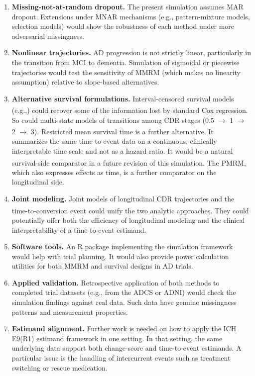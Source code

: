\documentclass[
  11pt,
]{article}
\begin{document}
\begin{enumerate}
\def\labelenumi{\arabic{enumi}.}
\item
  \textbf{Missing-not-at-random dropout.} The present
  simulation assumes MAR dropout. Extensions under MNAR
  mechanisms (e.g., pattern-mixture models, selection
  models) would show the robustness of each method under
  more adversarial missingness.
\item
  \textbf{Nonlinear trajectories.} AD progression is not
  strictly linear, particularly in the transition from
  MCI to dementia. Simulation of sigmoidal or piecewise
  trajectories would test the sensitivity of MMRM (which
  makes no linearity assumption) relative to slope-based
  alternatives.
\item
  \textbf{Alternative survival formulations.} Interval-censored
  survival models (e.g.,\textsuperscript{}) could recover
  some of the information lost by standard Cox
  regression. So could multi-state models of transitions
  among CDR stages (0.5 \(\to\) 1 \(\to\) 2 \(\to\) 3).
  Restricted mean survival time\textsuperscript{}
  is a further alternative. It summarizes the same
  time-to-event data on a continuous, clinically
  interpretable time scale and not as a hazard ratio. It
  would be a natural survival-side comparator in a future
  revision of this simulation. The PMRM\textsuperscript{}, which also expresses effects as time,
  is a further comparator on the longitudinal side.
\item
  \textbf{Joint modeling.} Joint models of longitudinal CDR
  trajectories and the time-to-conversion event\textsuperscript{} could unify the two analytic
  approaches. They could potentially offer both the
  efficiency of longitudinal modeling and the clinical
  interpretability of a time-to-event estimand.
\item
  \textbf{Software tools.} An R package implementing the
  simulation framework would help with trial planning.
  It would also provide power calculation utilities for
  both MMRM and survival designs in AD trials.
\item
  \textbf{Applied validation.} Retrospective application of
  both methods to completed trial datasets (e.g., from the
  ADCS or ADNI) would check the simulation findings
  against real data. Such data have genuine missingness
  patterns and measurement properties.
\item
  \textbf{Estimand alignment.} Further work is needed on how
  to apply the ICH E9(R1) estimand framework in one
  setting. In that setting, the same underlying data
  support both change-score and time-to-event estimands.
  A particular issue is the handling of intercurrent
  events such as treatment switching or rescue
  medication.
\end{enumerate}
\end{document}
